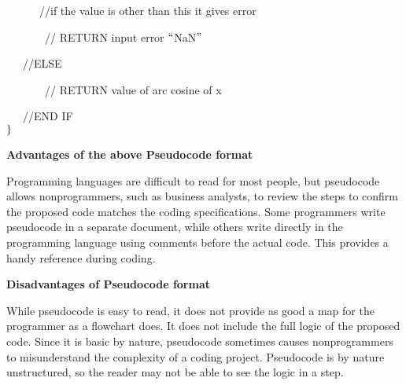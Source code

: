 \documentclass[12pt]{article}
\begin{document}
\tab \ \ \ \ \ \  //if the value is other than this it gives error\par

\ \ \ \ \ \ \  // RETURN input error $``$NaN$"$  \par

\ \ \  //ELSE \par

\ \ \ \ \ \ \  // RETURN value of arc cosine of x\par

\ \ \  //END IF\\
$ \} $ \par


\vspace{\baselineskip}
\begin{justify}
\textbf{Advantages of the above Pseudocode format}
\end{justify}\par

\setlength{\parskip}{18.72pt}
\begin{justify}
\tab Programming languages are difficult to read for most people, but pseudocode allows nonprogrammers, such as business analysts, to review the steps to confirm the proposed code matches the coding specifications. Some programmers write pseudocode in a separate document, while others write directly in the programming language using comments before the actual code. This provides a handy reference during coding.
\end{justify}\par

\begin{justify}
\textbf{Disadvantages of Pseudocode format}
\end{justify}\par

\begin{justify}
\tab While pseudocode is easy to read, it does not provide as good a map for the programmer as a flowchart does. It does not include the full logic of the proposed code. Since it is basic by nature, pseudocode sometimes causes nonprogrammers to misunderstand the complexity of a coding project. Pseudocode is by nature unstructured, so the reader may not be able to see the logic in a step.
\end{justify}\par

\setlength{\parskip}{8.04pt}


\end{document}
